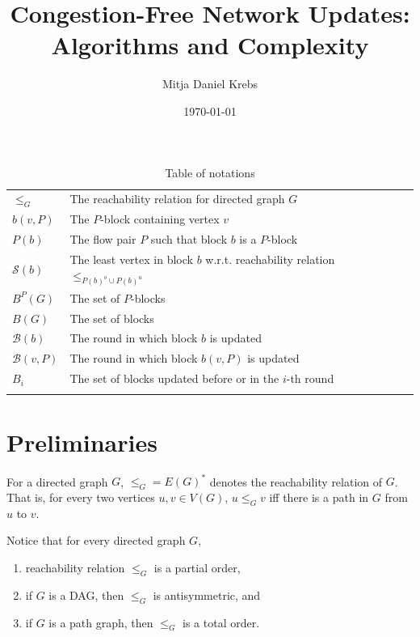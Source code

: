 \documentclass[fontsize=11pt,paper=a4]{book}
\author{Mitja Daniel Krebs}
\date{\today}
\title{Congestion-Free Network Updates: Algorithms and Complexity}
\begin{document}
\maketitle
\tableofcontents

\begin{table}[htbp]
\caption{Table of notations}
\centering
\begin{tabular}{ll}
\hyperref[org1b69eba]{\(\leq_G\)} & The reachability relation for directed graph \(G\)\\[0pt]
\hyperref[org072524f]{\(b(v,P)\)} & The \(P\)-block containing vertex \(v\)\\[0pt]
\hyperref[org51c0575]{\(P(b)\)} & The flow pair \(P\) such that block \(b\) is a \(P\)-block\\[0pt]
\hyperref[orgdcabd12]{\(\mathcal{S}(b)\)} & The least vertex in block \(b\) w.r.t. reachability relation \(\leq_{P(b)^o\cup P(b)^u}\)\\[0pt]
\hyperref[org3a72523]{\(B^P(G)\)} & The set of \(P\)-blocks\\[0pt]
\hyperref[orgaf5c11c]{\(B(G)\)} & The set of blocks\\[0pt]
\hyperref[org1d57970]{\(\mathcal{B}(b)\)} & The round in which block \(b\) is updated\\[0pt]
\hyperref[org45f406f]{\(\mathcal{B}(v,P)\)} & The round in which block \(b(v,P)\) is updated\\[0pt]
\hyperref[orge41a594]{\(B_i\)} & The set of blocks updated before or in the \(i\)-th round\\[0pt]
 & \\[0pt]
\end{tabular}
\end{table}

\part{Preliminaries}
\label{sec:org08c7ac8}

\begin{notation}
For a directed graph \(G\), \(\leq_G=E(G)^*\) denotes the reachability relation of \(G\).
That is, for every two vertices \(u,v\in V(G)\), \(u\leq_Gv\) iff there is a path in \(G\) from \(u\) to \(v\).
\label{org1b69eba}
\end{notation}

Notice that for every directed graph \(G\),

\begin{enumerate}
\item reachability relation \(\leq_G\) is a partial order,

\item if \(G\) is a DAG, then \(\leq_G\) is antisymmetric, and

\item if \(G\) is a path graph, then \(\leq_G\) is a total order.
\end{enumerate}
\end{document}
